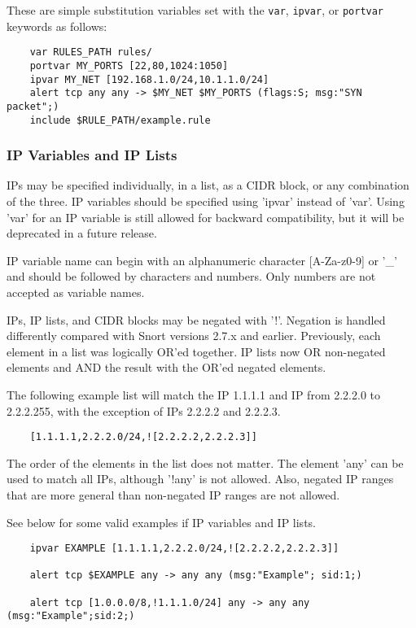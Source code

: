 \documentclass[english]{report}
\begin{document}
These are simple substitution variables set with the {\tt var}, {\tt ipvar}, or
{\tt portvar} keywords as follows:

\begin{verbatim}
    var RULES_PATH rules/
    portvar MY_PORTS [22,80,1024:1050]
    ipvar MY_NET [192.168.1.0/24,10.1.1.0/24]
    alert tcp any any -> $MY_NET $MY_PORTS (flags:S; msg:"SYN packet";)
    include $RULE_PATH/example.rule
\end{verbatim}

\subsubsection{IP Variables and IP Lists}

IPs may be specified individually, in a list, as a CIDR block, or any
combination of the three.  IP variables should be specified using 'ipvar'
instead of 'var'.  Using 'var' for an IP variable is still allowed for backward
compatibility, but it will be deprecated in a future release.

IP variable name can begin with an alphanumeric character [A-Za-z0-9] or '\_'
and should be followed by characters and numbers. Only numbers are not
accepted as variable names.

IPs, IP lists, and CIDR blocks may be negated with '!'.  Negation is handled
differently compared with Snort versions 2.7.x and earlier.  Previously, each
element in a list was logically OR'ed together.  IP lists now OR non-negated
elements and AND the result with the OR'ed negated elements.  

The following example list will match the IP 1.1.1.1 and IP from 2.2.2.0 to
2.2.2.255, with the exception of IPs 2.2.2.2 and 2.2.2.3.

\begin{verbatim}
    [1.1.1.1,2.2.2.0/24,![2.2.2.2,2.2.2.3]] 
\end{verbatim}

The order of the elements in the list does not matter.  The element 'any' can
be used to match all IPs, although '!any' is not allowed.  Also, negated IP
ranges that are more general than non-negated IP ranges are not allowed.  

See below for some valid examples if IP variables and IP lists.

\begin{verbatim}
    ipvar EXAMPLE [1.1.1.1,2.2.2.0/24,![2.2.2.2,2.2.2.3]] 
    
    alert tcp $EXAMPLE any -> any any (msg:"Example"; sid:1;)

    alert tcp [1.0.0.0/8,!1.1.1.0/24] any -> any any (msg:"Example";sid:2;)
\end{verbatim}
\end{document}
